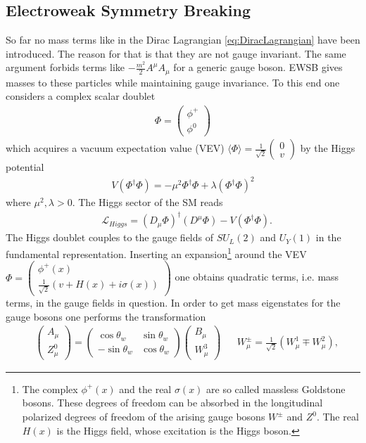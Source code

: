 \subsection{Electroweak Symmetry Breaking}\label{sec:EWSB}
So far no mass terms like in the Dirac Lagrangian \ref{eq:DiracLagrangian} have been introduced. The reason for that is that they are not gauge invariant. The same argument forbids terms like $-\frac{m^2}{2}A^\mu A_\mu$ for a generic gauge boson. EWSB gives masses to these particles while maintaining gauge invariance. To this end one considers a complex scalar doublet
\begin{align}
\Phi = \begin{pmatrix}
\phi^+ \\ 
\phi^0
\end{pmatrix}
\end{align}
which acquires a vacuum expectation value (VEV) $\langle \Phi \rangle = \frac{1}{\sqrt{2}}\begin{pmatrix}
0 \\ v
\end{pmatrix}$ by the Higgs potential
\begin{align}
V(\Phi^\dagger\Phi) = -\mu^2 \Phi^\dagger\Phi + \lambda (\Phi^\dagger\Phi)^2
\end{align}
where $\mu^2,\lambda > 0$.
The Higgs sector of the SM reads
\begin{align}
&\mathcal{L}_{Higgs} = (D_\mu \Phi)^\dagger (D^\mu \Phi) - V(\Phi^\dagger\Phi).
\end{align}
The Higgs doublet couples to the gauge fields of $SU_L(2)$ and $U_Y(1)$ in the fundamental representation. Inserting an expansion\footnote{The complex $\phi^+(x)$ and the real $\sigma(x)$ are so called massless Goldstone bosons. These degrees of freedom can be absorbed in the longitudinal polarized degrees of freedom of the arising gauge bosons $W^\pm$ and $Z^0$. The real $H(x)$ is the Higgs field, whose excitation is the Higgs boson.} around the VEV $\Phi = \begin{pmatrix}
\phi^+(x) \\
\frac{1}{\sqrt{2}} (v + H(x) + i\sigma(x))
\end{pmatrix}$ one obtains quadratic terms, i.e. mass terms, in the gauge fields in question. In order to get mass eigenstates for the gauge bosons one performs the transformation
\begin{align}
&\begin{pmatrix}
A_\mu \\
Z^0_\mu
\end{pmatrix} = \begin{pmatrix}
\cos \theta_w & \sin \theta_w \\
-\sin \theta_w & \cos \theta_w
\end{pmatrix} \begin{pmatrix}
B_\mu \\
W^3_\mu
\end{pmatrix}
&& W^{\pm}_\mu = \frac{1}{\sqrt{2}}(W^1_\mu \mp W^2_\mu),
\end{align}

